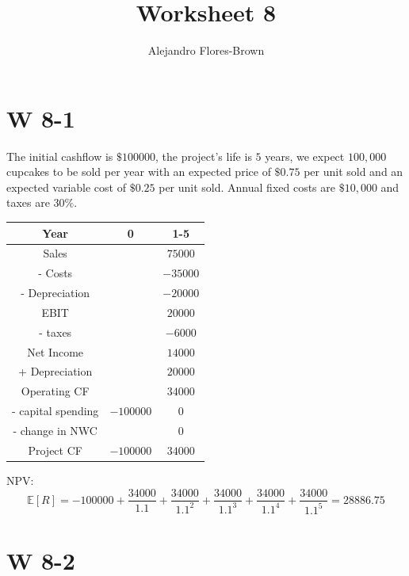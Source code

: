 \documentclass[12pt, letterpaper, parskip = full]{article}
\title{Worksheet 8}
\author{Alejandro Flores-Brown}
\newcommand{\Ex}[1]{\mathbb{E}\left[#1\right]}
\begin{document}
	\maketitle

    \section{W 8-1}

    The initial cashflow is \(\$100000\), the project's life is \(5\) years, we expect \(100,000\) cupcakes to be sold per year with an expected price of \(\$0.75\) per unit sold and an expected variable cost of \(\$0.25\) per unit sold. Annual fixed costs are \(\$10,000\) and taxes are \(30\%\). 

    \begin{center}
	\begin{tabular}{|c|c|c|}
		\hline
		Year & 0 & 1-5 \\
		\hline
		Sales&  & \(75000\) \\
        \hline
        - Costs & & \(-35000\) \\
        \hline
        - Depreciation & & \(-20000\) \\
        \hline
        \hline
        EBIT & & \(20000\) \\
        \hline
        - taxes & & \(-6000\) \\
        \hline
        \hline
        Net Income & & \(14000\) \\
        \hline
        + Depreciation & & \(20000\) \\
        \hline
        \hline
        Operating CF & & \(34000\) \\
        \hline
        - capital spending & \(-100000\) & \(0\) \\
        \hline
        - change in NWC & & \(0\) \\
        \hline
        \hline
        Project CF & \(-100000\) & \(34000\) \\
        \hline
	\end{tabular}
	\end{center}

    NPV: 
    \[ \Ex{R} = -100000 + \frac{34000}{1.1} + \frac{34000}{1.1^2} + \frac{34000}{1.1^3} + \frac{34000}{1.1^4} + \frac{34000}{1.1^5} = 28886.75 \]

    \section{W 8-2}
\end{document}
